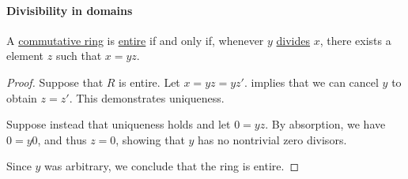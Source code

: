 \paragraph{Divisibility in domains}

\begin{proposition}\label{thm:ring_entire_iff_unique_quotient}
  A \hyperref[def:ring/commutative]{commutative ring} is \hyperref[def:entire_semiring]{entire} if and only if, whenever \( y \) \hyperref[def:divisibility]{divides} \( x \), there exists a  element \( z \) such that \( x = yz \).
\end{proposition}
\begin{proof}
  \SufficiencySubProof Suppose that \( R \) is entire. Let \( x = yz = yz' \).  implies that we can cancel \( y \) to obtain \( z = z' \). This demonstrates uniqueness.

  \NecessitySubProof Suppose instead that uniqueness holds and let \( 0 = yz \). By absorption, we have \( 0 = y0 \), and thus \( z = 0 \), showing that \( y \) has no nontrivial zero divisors.

  Since \( y \) was arbitrary, we conclude that the ring is entire.
\end{proof}

